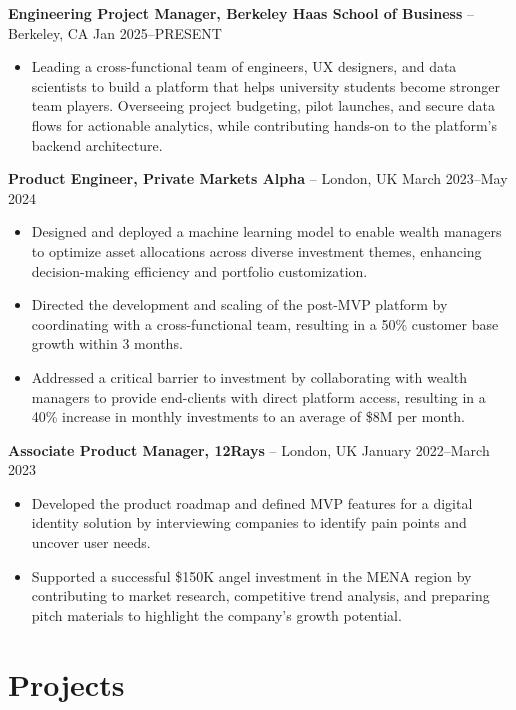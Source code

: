 \documentclass{article}
\begin{document}
\textbf{Engineering Project Manager, Berkeley Haas School of Business} -- Berkeley, CA \hfill Jan 2025--PRESENT
\begin{itemize}[leftmargin=*, noitemsep]
    \item Leading a cross-functional team of engineers, UX designers, and data scientists to build a platform that helps university students become stronger team players. Overseeing project budgeting, pilot launches, and secure data flows for actionable analytics, while contributing hands-on to the platform's backend architecture.
\end{itemize}

\textbf{Product Engineer, Private Markets Alpha} -- London, UK \hfill March 2023--May 2024
\begin{itemize}[leftmargin=*, noitemsep]
    \item Designed and deployed a machine learning model to enable wealth managers to optimize asset allocations across diverse investment themes, enhancing decision-making efficiency and portfolio customization.
    \item Directed the development and scaling of the post-MVP platform by coordinating with a cross-functional team, resulting in a 50\% customer base growth within 3 months.
    \item Addressed a critical barrier to investment by collaborating with wealth managers to provide end-clients with direct platform access, resulting in a 40\% increase in monthly investments to an average of \$8M per month.
\end{itemize}

\textbf{Associate Product Manager, 12Rays} -- London, UK \hfill January 2022--March 2023
\begin{itemize}[leftmargin=*, noitemsep]
    \item Developed the product roadmap and defined MVP features for a digital identity solution by interviewing companies to identify pain points and uncover user needs.
    \item Supported a successful \$150K angel investment in the MENA region by contributing to market research, competitive trend analysis, and preparing pitch materials to highlight the company's growth potential.
\end{itemize}

\section*{Projects}
\end{document}
